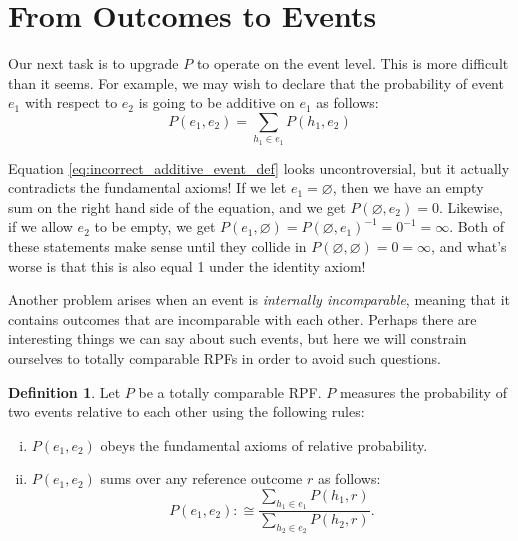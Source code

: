 \documentclass[twoside]{article}
\theoremstyle{plain}%
\theoremstyle{definition}
\newtheorem{definition}{Definition}[section]
\theoremstyle{remark}
\begin{document}
\section{From Outcomes to Events}
\label{section:outcomes_to_events}

Our next task is to upgrade \(P\) to operate on the event level. This is more difficult than it seems. For example, we may wish to declare that the probability of event \(e_1\) with respect to \(e_2\) is going to be additive on \(e_1\) as follows:
\begin{equation}
\label{eq:incorrect_additive_event_def}
P(e_1, e_2) = \sum_{h_1 \in e_1}P(h_1, e_2)
\end{equation}

Equation \ref{eq:incorrect_additive_event_def} looks uncontroversial, but it actually contradicts the fundamental axioms! If we let \(e_1 = \varnothing\), then we have an empty sum on the right hand side of the equation, and we get \(P(\varnothing, e_2) = 0\). Likewise, if we allow \(e_2\) to be empty, we get \(P(e_1, \varnothing) = P(\varnothing, e_1)^{-1}=0^{-1}=\infty\). Both of these statements make sense until they collide in \(P(\varnothing, \varnothing) = 0 = \infty\), and what's worse is that this is also equal 1 under the identity axiom!

Another problem arises when an event is \textit{internally incomparable}, meaning that it contains outcomes that are incomparable with each other. Perhaps there are interesting things we can say about such events, but here we will constrain ourselves to totally comparable RPFs in order to avoid such questions.

\begin{definition}
\label{def:event_comparison}
Let \(P\) be a totally comparable RPF. \(P\) measures the probability of two events relative to each other using the following rules:

\begin{enumerate}[(i)]
  \item \label{event_def_1} \(P(e_1, e_2)\) obeys the fundamental axioms of relative probability.
  \item \label{event_def_2} \(P(e_1, e_2)\) sums over any reference outcome \(r\) as follows:
    \begin{equation}
      \label{eq:event_def_ratio_match}
      P(e_1, e_2) :\cong \frac{\sum_{h_1 \in e_1} P(h_1, r)}{\sum_{h_2 \in e_2} P(h_2, r)}.
    \end{equation}
\end{enumerate}
\end{definition}
\end{document}
